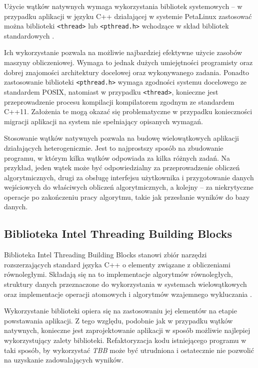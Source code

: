 Użycie wątków natywnych wymaga wykorzystania bibliotek systemowych -- w przypadku aplikacji w języku C++ działającej w systemie PetaLinux zastosować można biblioteki \texttt{<thread>} lub \texttt{<pthread.h>} wchodzące w skład bibliotek standardowych \cite{Williams2013}.
 
Ich wykorzystanie pozwala na możliwie najbardziej efektywne użycie zasobów maszyny obliczeniowej. 
Wymaga to jednak dużych umiejętności programisty oraz dobrej znajomości architektury docelowej oraz wykonywanego zadania. 
Ponadto zastosowanie biblioteki \texttt{<pthread.h>} wymaga zgodności systemu docelowego ze standardem POSIX, natomiast w przypadku \texttt{<thread>}, konieczne jest przeprowadzenie procesu kompilacji kompilatorem zgodnym ze standardem C++11. 
Założenia te mogą okazać się problematyczne w przypadku konieczności migracji aplikacji na system nie spełniający opisanych wymagań.

Stosowanie wątków natywnych pozwala na budowę wielowątkowych aplikacji działających heterogenicznie. 
Jest to najprostszy sposób na zbudowanie programu, w którym kilka wątków odpowiada za kilka różnych zadań. 
Na przykład, jeden wątek może być odpowiedzialny za przeprowadzenie obliczeń algorytmicznych, drugi za obsługę interfejsu użytkownika i przygotowanie danych wejściowych do właściwych obliczeń algorytmicznych, a kolejny -- za niekrytyczne operacje po zakończeniu pracy algorytmu, takie jak przesłanie wyników do bazy danych.

\subsection{Biblioteka Intel Threading Building Blocks}

Biblioteka Intel Threading Building Blocks stanowi zbiór narzędzi rozszerzających standard języka C++ o elementy związane z obliczeniami równoległymi. 
Składają się na to implementacje algorytmów równoległych, struktury danych przeznaczone do wykorzystania w systemach wielowątkowych oraz implementacje operacji atomowych i algorytmów wzajemnego wykluczania \cite{Reinders2010}.

Wykorzystanie biblioteki opiera się na zastosowaniu jej elementów na etapie powstawania aplikacji. 
Z tego względu, podobnie jak w przypadku wątków natywnych, konieczne jest zaprojektowanie aplikacji w sposób możliwie najlepiej wykorzystujący zalety biblioteki. 
Refaktoryzacja kodu istniejącego programu w taki sposób, by wykorzystać \emph{TBB} może być utrudniona i ostatecznie nie pozwolić na uzyskanie zadowalających wyników.

